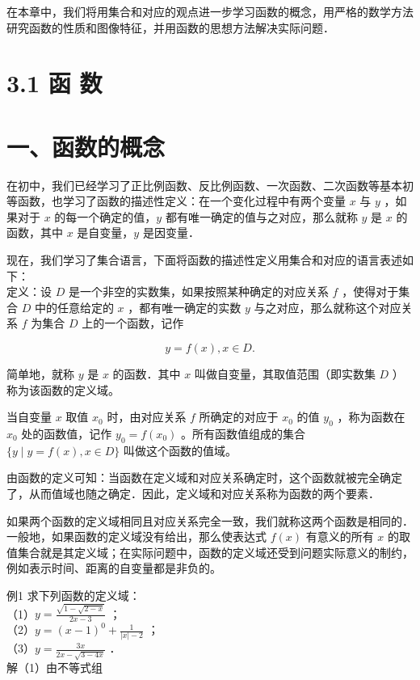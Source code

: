 \documentclass[10pt]{article}
\begin{document}
在本章中，我们将用集合和对应的观点进一步学习函数的概念，用严格的数学方法研究函数的性质和图像特征，并用函数的思想方法解决实际问题．

\section*{3.1 函 数}
\section*{一、函数的概念}
在初中，我们已经学习了正比例函数、反比例函数、一次函数、二次函数等基本初等函数，也学习了函数的描述性定义：在一个变化过程中有两个变量 \(x\) 与 \(y\) ，如果对于 \(x\) 的每一个确定的值，\(y\) 都有唯一确定的值与之对应，那么就称 \(y\) 是 \(x\) 的函数，其中 \(x\) 是自变量，\(y\) 是因变量．

现在，我们学习了集合语言，下面将函数的描述性定义用集合和对应的语言表述如下：\\
定义：设 \(D\) 是一个非空的实数集，如果按照某种确定的对应关系 \(f\) ，使得对于集合 \(D\) 中的任意给定的 \(x\) ，都有唯一确定的实数 \(y\) 与之对应，那么就称这个对应关系 \(f\) 为集合 \(D\) 上的一个函数，记作

\[
y=f(x), x \in D .
\]

简单地，就称 \(y\) 是 \(x\) 的函数．其中 \(x\) 叫做自变量，其取值范围（即实数集 \(D\) ）称为该函数的定义域。

当自变量 \(x\) 取值 \(x_{0}\) 时，由对应关系 \(f\) 所确定的对应于 \(x_{0}\) 的值 \(y_{0}\) ，称为函数在 \(x_{0}\) 处的函数值，记作 \(y_{0}=f\left(x_{0}\right)\) 。所有函数值组成的集合 \(\{y \mid y=f(x), x \in D\}\) 叫做这个函数的值域。

由函数的定义可知：当函数在定义域和对应关系确定时，这个函数就被完全确定了，从而值域也随之确定．因此，定义域和对应关系称为函数的两个要素．

如果两个函数的定义域相同且对应关系完全一致，我们就称这两个函数是相同的．\\
一般地，如果函数的定义域没有给出，那么使表达式 \(f(x)\) 有意义的所有 \(x\) 的取值集合就是其定义域；在实际问题中，函数的定义域还受到问题实际意义的制约，例如表示时间、距离的自变量都是非负的。

例1 求下列函数的定义域：\\
（1）\(y=\frac{\sqrt{1-\sqrt{2-x}}}{2 x-3}\) ；\\
（2）\(y=(x-1)^{0}+\frac{1}{|x|-2}\) ；\\
（3）\(y=\frac{3 x}{2 x-\sqrt{3-4 x}}\) ．\\
解（1）由不等式组
\end{document}
